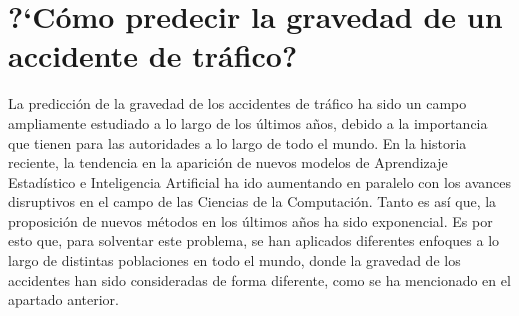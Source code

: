 \documentclass{uathesis-es}
\begin{document}


\section{?`Cómo predecir la gravedad de un accidente de tráfico?}





La predicción de la gravedad de los accidentes de tráfico ha sido un campo ampliamente estudiado a lo largo de los últimos años, debido a la importancia que tienen para las autoridades a lo largo de todo el mundo. En la historia reciente, la tendencia en la aparición de nuevos modelos de Aprendizaje Estadístico e Inteligencia Artificial ha ido aumentando en paralelo con los avances disruptivos en el campo de las Ciencias de la Computación. Tanto es así que, la proposición de nuevos métodos en los últimos años ha sido exponencial. Es por esto que, para solventar este problema, se han aplicados diferentes enfoques a lo largo de distintas poblaciones en todo el mundo, donde la gravedad de los accidentes han sido consideradas de forma diferente, como se ha mencionado en el apartado anterior.
\end{document}
